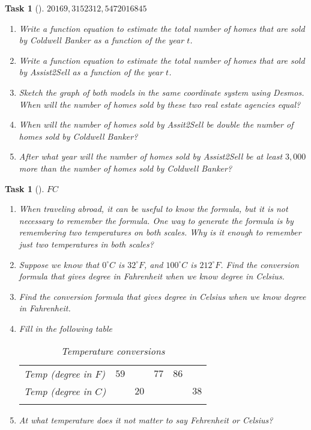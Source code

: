 \documentclass[10pt,]{article}
\theoremstyle{plain}
\newtheorem{proposition}[theorem]{Task}
\theoremstyle{definition}
\numberwithin{equation}{section}
\newcommand{\hrulemedium}{\noalign{\hrule height 0.07em}}
\begin{document}
\begin{proposition}[{}]\label{proposition-3}
\(2016\)\(9,315\)\(231\)\(2,547\)\(2016\)\(845\)\leavevmode%
\begin{enumerate}
\item\hypertarget{li-46}{}Write a function equation to estimate the total number of homes that are sold by Coldwell Banker as a function of the year \(t\).%
\item\hypertarget{li-47}{}Write a function equation to estimate the total number of homes that are sold by Assist2Sell as a function of the year \(t\).%
\item\hypertarget{li-48}{}Sketch the graph of both models in the same coordinate system using Desmos. When will the number of homes 	sold by these two real estate agencies equal?%
\item\hypertarget{li-49}{}When will the number of homes sold by Assit2Sell be double the number of homes sold by Coldwell Banker?%
\item\hypertarget{li-50}{}After what year will the number of homes sold by Assist2Sell be at least \(3,000\) more than the number of homes sold by Coldwell Banker?%
\end{enumerate}
\end{proposition}
\begin{proposition}[{}]\label{proposition-4}
\(F\)\(C\)\leavevmode%
\begin{enumerate}
\item\hypertarget{li-51}{}When traveling abroad, it can be useful to know the formula, but it is not necessary to remember the formula. One way to generate the formula is by remembering two temperatures on both scales. Why is it enough to remember just two temperatures in both scales?%
\item\hypertarget{li-52}{}Suppose we know that \(0^{\circ} C\) is \(32^{\circ} F\), and \(100^{\circ} C\) is \(212^{\circ} F\). Find the conversion formula that gives degree in Fahrenheit when we know degree in Celsius.%
\item\hypertarget{li-53}{}Find the conversion formula that gives degree in Celsius when we know degree in Fahrenheit.%
\item\hypertarget{li-54}{}Fill in the following table \leavevmode%
\begin{table}
\centering
\begin{tabular}{lc}\hrulemedium
Temp (degree in \(F\))&\(59\)&&\(77\)&\(86\)&\tabularnewline\hrulemedium
Temp (degree in \(C\))&&\(20\)&&&\(38\)\tabularnewline\hrulemedium
\end{tabular}
\caption{Temperature conversions\label{table-2}}
\end{table}
%
\item\hypertarget{li-55}{}At what temperature does it not matter to say Fehrenheit or Celsius?%
\end{enumerate}
\end{proposition}
\end{document}
